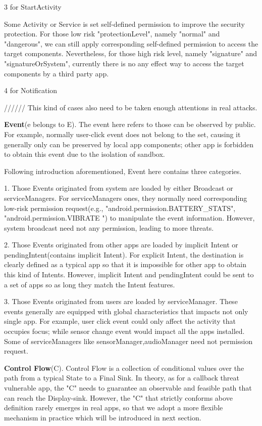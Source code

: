 \documentclass{sig-alternate-05-2015}
\begin{document}
3 for StartActivity

Some Activity or Service is set self-defined permission to improve the security protection. For those low risk "protectionLevel", namely "normal" and "dangerous", we can still apply corresponding self-defined permission to access the target components. Nevertheless, for those high risk level, namely "signature" and "signatureOrSystem", currently there is no any effect way to access the target components by a third party app.

4 for Notification

 ////// This kind of cases also need to be taken enough attentions in real attacks. 


 \textbf{Event}(e belongs to E).  The event here refers to those can be observed by public. For example, normally user-click event does not belong to the set, causing it generally only can be preserved by local app components; other app is forbidden to obtain this event due to the isolation of sandbox.

Following introduction aforementioned, Event here contains three categories.

1. Those Events originated from system are loaded by either Broadcast or serviceManagers. For serviceManagers ones, they normally need corresponding low-risk permission request(e.g., "android.permission.BATTERY\_STATS", "android.permission.VIBRATE ") to manipulate the event information. However, system broadcast need not any permission, leading to more threats.

2. Those Events originated from other apps are loaded by implicit Intent or pendingIntent(contains implicit Intent). For explicit Intent, the destination is clearly defined as a typical app so that it is impossible for other app to obtain this kind of Intents. However, implicit Intent and pendingIntent could be sent to a set of apps so as long they match the Intent features.

3. Those Events originated from users are loaded by serviceManager. These events generally are equipped with global characteristics that impacts not only single app.  For example, user click event could only affect the activity that occupies focus; while sensor change event would impact all the apps installed. Some of serviceManagers like sensorManager,audioManager need not permission request.

\textbf{Control Flow}(C). Control Flow is a collection of conditional values over the path from a typical State to a Final Sink. In theory, as for a callback threat vulnerable app, the "C" needs to guarantee an observable and feasible path that can reach the Display-sink. However, the "C" that strictly conforms above definition rarely emerges in real apps, so that we adopt a more flexible mechanism in practice which will be introduced in next section.  
\end{document}
